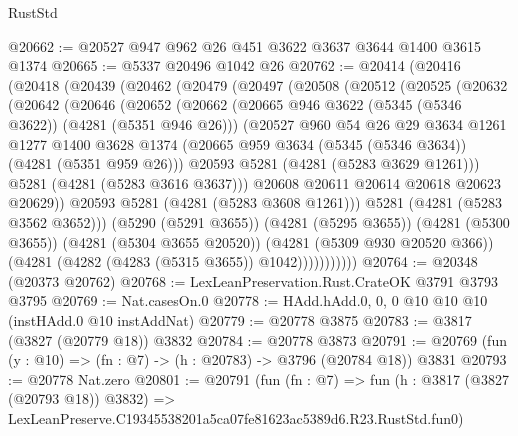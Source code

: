\begin{lexlean}{RustStd}
\begin{coremodule}
@20662 := @20527 @947 @962 @26 @451 @3622 @3637 @3644 @1400 @3615 @1374
@20665 := @5337 @20496 @1042 @26
@20762 := @20414
    (@20416
      (@20418
        (@20439
          (@20462
            (@20479
              (@20497
                (@20508
                  (@20512
                    (@20525
                      (@20632
                        (@20642
                          (@20646
                            (@20652
                              (@20662
                                (@20665 @946 @3622 (@5345 (@5346 @3622)) (@4281 (@5351 @946 @26)))
                                (@20527
                                  @960
                                  @54
                                  @26
                                  @29
                                  @3634
                                  @1261
                                  @1277
                                  @1400
                                  @3628
                                  @1374
                                  (@20665 @959 @3634 (@5345 (@5346 @3634)) (@4281 (@5351 @959 @26)))
                                  @20593
                                  @5281
                                  (@4281 (@5283 @3629 @1261)))
                                @5281
                                (@4281 (@5283 @3616 @3637)))
                              @20608
                              @20611
                              @20614
                              @20618
                              @20623
                              @20629))
                          @20593
                          @5281
                          (@4281 (@5283 @3608 @1261)))
                        @5281
                        (@4281 (@5283 @3562 @3652)))
                      (@5290 (@5291 @3655))
                      (@4281 (@5295 @3655))
                      (@4281 (@5300 @3655))
                      (@4281 (@5304 @3655 @20520))
                      (@4281 (@5309 @930 @20520 @366))
                      (@4281 (@4282 (@4283 (@5315 @3655)) @1042)))))))))))
@20764 := @20348 (@20373 @20762)
@20768 := LexLeanPreservation.Rust.CrateOK @3791 @3793 @3795
@20769 := Nat.casesOn.{0}
@20778 := HAdd.hAdd.{0, 0, 0} @10 @10 @10 (instHAdd.{0} @10 instAddNat)
@20779 := @20778 @3875
@20783 := @3817 (@3827 (@20779 @18)) @3832
@20784 := @20778 @3873
@20791 := @20769 (fun (y : @10) => (fn : @7) -> (h : @20783) -> @3796 (@20784 @18)) @3831
@20793 := @20778 Nat.zero
@20801 := @20791
    (fun (fn : @7) =>
    fun (h : @3817 (@3827 (@20793 @18)) @3832) =>
    LexLeanPreserve.C19345538201a5ca07fe81623ac5389d6.R23.RustStd.fun0)

\end{coremodule}
\end{lexlean}
